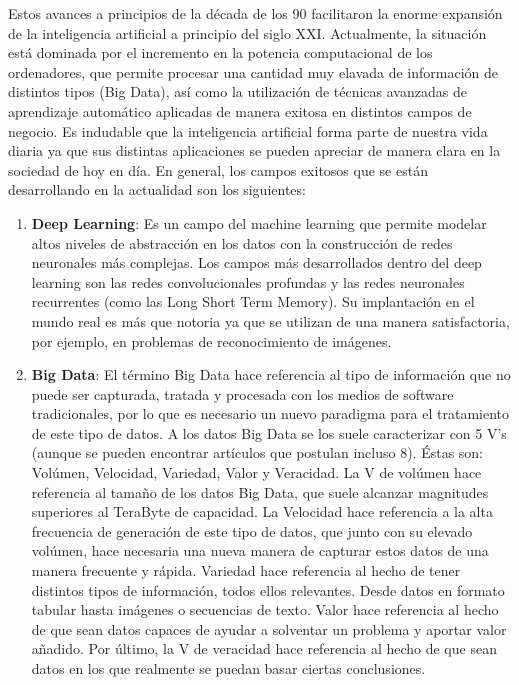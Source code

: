 \documentclass[]{DissertateUSU}
\begin{document}
\noindent Estos avances a principios de la década de los 90 facilitaron
la enorme expansión de la inteligencia artificial a principio del siglo
XXI. Actualmente, la situación está dominada por el incremento en la
potencia computacional de los ordenadores, que permite procesar una
cantidad muy elavada de información de distintos tipos (Big Data), así
como la utilización de técnicas avanzadas de aprendizaje automático
aplicadas de manera exitosa en distintos campos de negocio. Es indudable
que la inteligencia artificial forma parte de nuestra vida diaria ya que
sus distintas aplicaciones se pueden apreciar de manera clara en la
sociedad de hoy en día. En general, los campos exitosos que se están
desarrollando en la actualidad son los siguientes:

\begin{enumerate}
\def\labelenumi{\roman{enumi})}
\item
  \textbf{Deep Learning}: Es un campo del machine learning que permite
  modelar altos niveles de abstracción en los datos con la construcción
  de redes neuronales más complejas. Los campos más desarrollados dentro
  del deep learning son las redes convolucionales profundas y las redes
  neuronales recurrentes (como las Long Short Term Memory). Su
  implantación en el mundo real es más que notoria ya que se utilizan de
  una manera satisfactoria, por ejemplo, en problemas de reconocimiento
  de imágenes.
\item
  \textbf{Big Data}: El término Big Data hace referencia al tipo de
  información que no puede ser capturada, tratada y procesada con los
  medios de software tradicionales, por lo que es necesario un nuevo
  paradigma para el tratamiento de este tipo de datos. A los datos Big
  Data se los suele caracterizar con 5 V's (aunque se pueden encontrar
  artículos que postulan incluso 8). Éstas son: Volúmen, Velocidad,
  Variedad, Valor y Veracidad. La V de volúmen hace referencia al tamaño
  de los datos Big Data, que suele alcanzar magnitudes superiores al
  TeraByte de capacidad. La Velocidad hace referencia a la alta
  frecuencia de generación de este tipo de datos, que junto con su
  elevado volúmen, hace necesaria una nueva manera de capturar estos
  datos de una manera frecuente y rápida. Variedad hace referencia al
  hecho de tener distintos tipos de información, todos ellos relevantes.
  Desde datos en formato tabular hasta imágenes o secuencias de texto.
  Valor hace referencia al hecho de que sean datos capaces de ayudar a
  solventar un problema y aportar valor añadido. Por último, la V de
  veracidad hace referencia al hecho de que sean datos en los que
  realmente se puedan basar ciertas conclusiones.
\end{enumerate}
\end{document}
